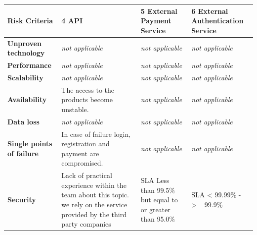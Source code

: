\begin{table}[H]
    \begin{tabularx}{\textwidth}{|l|X|X|X|}
        \toprule
        \textbf{Risk Criteria} & \textbf{4 API} & \textbf{5 External Payment Service} & \textbf{6 External Authentication Service} \\
        \midrule
        \textbf{Unproven technology} & \textit{not applicable} & \textit{not applicable}  & \textit{not applicable}  \\
        \hline
        \textbf{Performance} & \textit{not applicable} & \textit{not applicable}  & \textit{not applicable} \\
        \hline
        \textbf{Scalability} & \textit{not applicable} & \textit{not applicable} & \textit{not applicable} \\
        \hline
        \textbf{Availability} & The access to the products become unstable. & \textit{not applicable} & \textit{not applicable} \\
        \hline
        \textbf{Data loss} & \textit{not applicable} & \textit{not applicable} & \textit{not applicable} \\
        \hline
        \textbf{Single points of failure} & In case of failure login, registration and payment are compromised. & \textit{not applicable} & \textit{not applicable} \\
        \hline
        \textbf{Security} & Lack of practical experience within the team about this topic. we rely on the service provided by the third party companies 
        & SLA Less than 99.5\% but equal to or greater than 95.0\% \cite{refmisc:paycSLA} & SLA < 99.99\% - >= 99.9\% \cite{refmisc:auth0sla}	\\
        \bottomrule
    \end{tabularx}
\end{table}
%